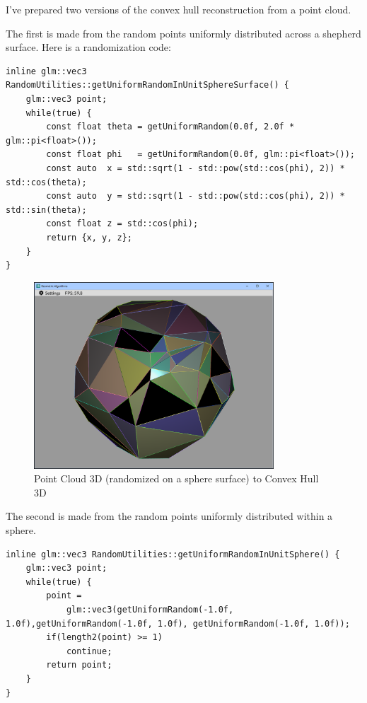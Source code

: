 \documentclass[12pt,a4paper,english]{article}
\begin{document}
I've prepared two versions of the convex hull reconstruction from a point cloud.

The first is made from the random points uniformly distributed across a shepherd surface.  Here is a randomization code:

\begin{verbatim}
inline glm::vec3 RandomUtilities::getUniformRandomInUnitSphereSurface() {
    glm::vec3 point;
    while(true) {
        const float theta = getUniformRandom(0.0f, 2.0f * glm::pi<float>());
        const float phi   = getUniformRandom(0.0f, glm::pi<float>());
        const auto  x = std::sqrt(1 - std::pow(std::cos(phi), 2)) * std::cos(theta);
        const auto  y = std::sqrt(1 - std::pow(std::cos(phi), 2)) * std::sin(theta);
        const float z = std::cos(phi);
        return {x, y, z};
    }
}
\end{verbatim}

\begin{figure}[H]
    \centering
    \includegraphics[width=0.8\textwidth]{p4-2-a}
    \caption[]{Point Cloud 3D (randomized on a sphere surface) to Convex Hull 3D}
    \label{fig:p4-2-a}
\end{figure}

\newpage

The second is made from the random points uniformly distributed within a sphere.

\begin{verbatim}
inline glm::vec3 RandomUtilities::getUniformRandomInUnitSphere() {
    glm::vec3 point;
    while(true) {
        point =
            glm::vec3(getUniformRandom(-1.0f, 1.0f),getUniformRandom(-1.0f, 1.0f), getUniformRandom(-1.0f, 1.0f));
        if(length2(point) >= 1)
            continue;
        return point;
    }
}
\end{verbatim}
\end{document}
